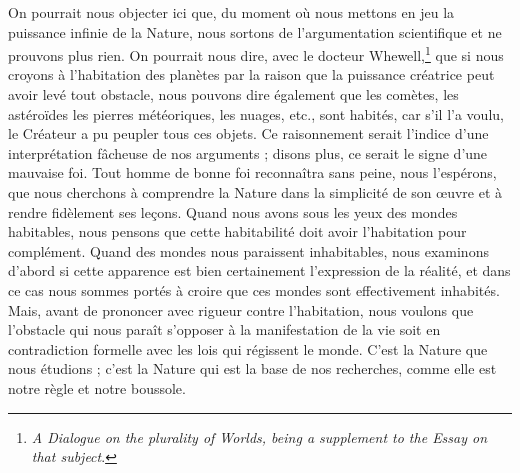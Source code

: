 \documentclass[a4paper, 11pt, oneside]{article}
\begin{document}
On pourrait nous objecter ici que, du moment où nous mettons en jeu la puissance infinie de la Nature, nous sortons de l'argumentation scientifique et ne prouvons plus rien. On pourrait nous dire, avec le docteur Whewell,\footnote{\emph{A Dialogue on the plurality of Worlds, being a supplement to the Essay on that subject}.} que si nous croyons à l'habitation des planètes par la raison que la puissance créatrice peut avoir levé tout obstacle, nous pouvons dire également que les comètes, les astéroïdes les pierres météoriques, les nuages, etc., sont habités, car s'il l'a voulu, le Créateur a pu peupler tous ces objets. Ce raisonnement serait l'indice d'une interprétation fâcheuse de nos arguments ; disons plus, ce serait le signe d'une mauvaise foi. Tout homme de bonne foi reconnaîtra sans peine, nous l'espérons, que nous cherchons à comprendre la Nature dans la simplicité de son œuvre et à rendre fidèlement ses leçons. Quand nous avons sous les yeux des mondes habitables, nous pensons que cette habitabilité doit avoir l'habitation pour complément. Quand des mondes nous paraissent inhabitables, nous examinons d'abord si cette apparence est bien certainement l'expression de la réalité, et dans ce cas nous sommes portés à croire que ces mondes sont effectivement inhabités. Mais, avant de prononcer avec rigueur contre l'habitation, nous voulons que l'obstacle qui nous paraît s'opposer à la manifestation de la vie soit en contradiction formelle avec les lois qui régissent le monde. C'est la Nature que nous étudions ; c'est la Nature qui est la base de nos recherches, comme elle est notre règle et notre boussole.
\end{document}
